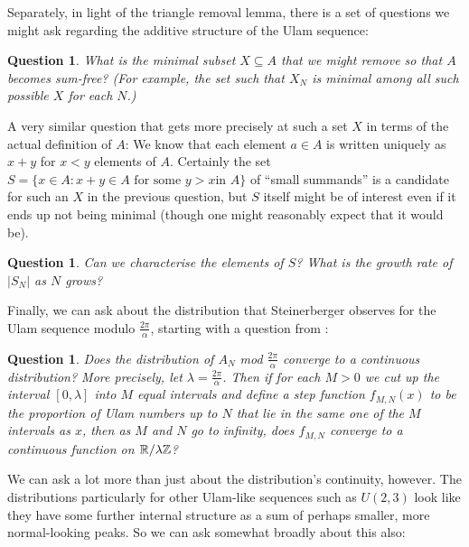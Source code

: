 \documentclass{report}
\newtheorem{question}[theorem]{Question}
\theoremstyle{remark}
\numberwithin{equation}{section}
\begin{document}
Separately, in light of the triangle removal lemma, there is a set of
questions we might ask regarding the additive structure of the Ulam
sequence:

\begin{question}\label{qn:ulam_sumfree}
  What is the minimal subset $X \subseteq A$ that we might remove so
  that $A$ becomes sum-free?  (For example, the set such that $X_N$ is
  minimal among all such possible $X$ for each $N$.)
\end{question}

A very similar question that gets more precisely at such a set $X$ in
terms of the actual definition of $A$: We know that each element
$a \in A$ is written uniquely as $x+y$ for $x < y$ elements of $A$.
Certainly the set $S = \{x \in A : x + y \in A\text{ for some $y > x$
  in $A$}\}$ of ``small summands'' is a candidate for such an $X$ in
the previous question, but $S$ itself might be of interest even if it
ends up not being minimal (though one might reasonably expect that it
would be).

\begin{question}\label{qn:fulcrum}
  Can we characterise the elements of $S$?  What is the growth rate of
  $|S_N|$ as $N$ grows?
\end{question}

Finally, we can ask about the distribution that Steinerberger observes
for the Ulam sequence modulo $\frac{2\pi}{\alpha}$, starting with a
question from \cite{steinerberger:preprint}: 

\begin{question}\label{qn:continuity}
  Does the distribution of $A_N$ mod $\frac{2\pi}{\alpha}$ converge to
  a continuous distribution?  More precisely, let
  $\lambda = \frac{2\pi}{\alpha}$.  Then if for each $M > 0$ we cut up
  the interval $[0,\lambda]$ into $M$ equal intervals and define a
  step function $f_{M,N}(x)$ to be the proportion of Ulam numbers up
  to $N$ that lie in the same one of the $M$ intervals as $x$, then as
  $M$ and $N$ go to infinity, does $f_{M,N}$ converge to a continuous
  function on $\mathbb{R}/\lambda\mathbb{Z}$?
\end{question}

We can ask a lot more than just about the distribution's continuity,
however.  The distributions particularly for other Ulam-like sequences
such as $U(2,3)$ look like they have some further internal structure
as a sum of perhaps smaller, more normal-looking peaks.  So we can ask
somewhat broadly about this also:
\end{document}
